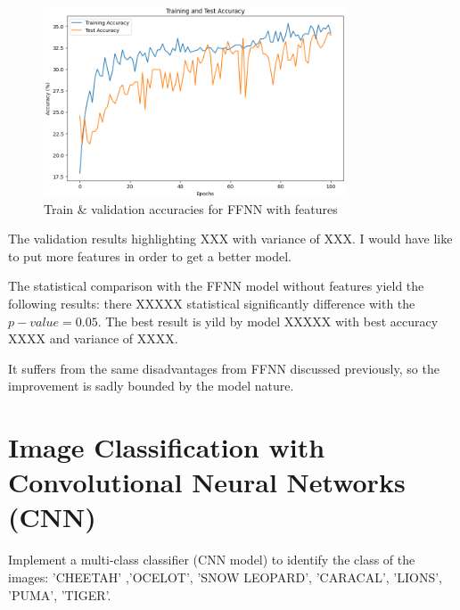 \documentclass[11pt]{scrartcl}
\begin{document}
\begin{figure}[htbp]
\centering
\includegraphics[width=0.8\textwidth]{./figures/task1-bonus-accuracy.png}
\caption{Train \& validation accuracies for FFNN with features}
\label{fig:task1-bonus-accuracy}
\end{figure}

The validation results highlighting XXX with variance of XXX.
I would have like to put more features in order to get a better model.

The statistical comparison with the FFNN model without features yield 
the following results:
there XXXXX statistical significantly difference with the \( p-value = 0.05 \).
The best result is yild by model XXXXX with best accuracy XXXX and variance of XXXX.

It suffers from the same disadvantages from FFNN discussed previously,
so the improvement is sadly bounded by the model nature.

\newpage

\section{Image Classification with Convolutional Neural Networks (CNN)}

Implement a multi-class classifier (CNN model) to identify the class of the images: 
'CHEETAH' ,'OCELOT', 'SNOW LEOPARD', 'CARACAL', 'LIONS', 'PUMA', 'TIGER'.
\end{document}
